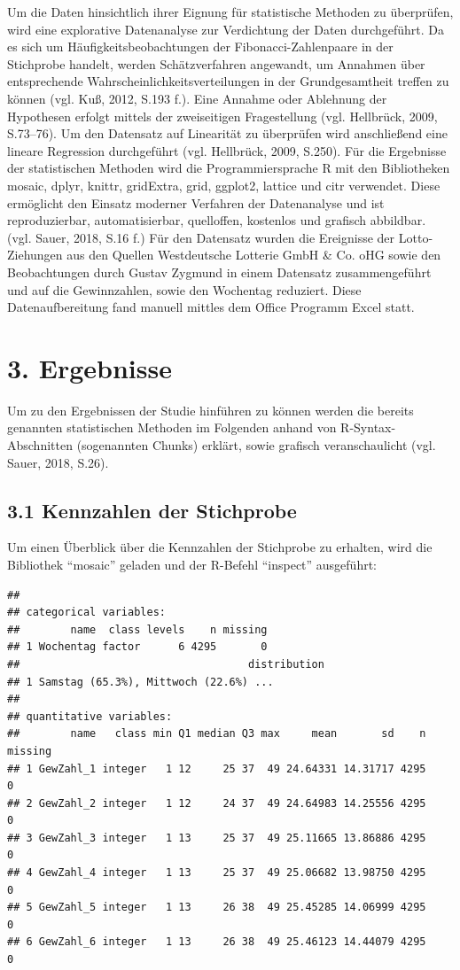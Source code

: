 \documentclass[ngerman,]{article}
\begin{document}
Um die Daten hinsichtlich ihrer Eignung für statistische Methoden zu
überprüfen, wird eine explorative Datenanalyse zur Verdichtung der Daten
durchgeführt. Da es sich um Häufigkeitsbeobachtungen der
Fibonacci-Zahlenpaare in der Stichprobe handelt, werden Schätzverfahren
angewandt, um Annahmen über entsprechende
Wahrscheinlichkeitsverteilungen in der Grundgesamtheit treffen zu können
(vgl. Kuß, 2012, S.193 f.). Eine Annahme oder Ablehnung der Hypothesen
erfolgt mittels der zweiseitigen Fragestellung (vgl. Hellbrück, 2009,
S.73--76). Um den Datensatz auf Linearität zu überprüfen wird
anschließend eine lineare Regression durchgeführt (vgl. Hellbrück, 2009,
S.250). Für die Ergebnisse der statistischen Methoden wird die
Programmiersprache R mit den Bibliotheken mosaic, dplyr, knittr,
gridExtra, grid, ggplot2, lattice und citr verwendet. Diese ermöglicht
den Einsatz moderner Verfahren der Datenanalyse und ist reproduzierbar,
automatisierbar, quelloffen, kostenlos und grafisch abbildbar. (vgl.
Sauer, 2018, S.16 f.) Für den Datensatz wurden die Ereignisse der
Lotto-Ziehungen aus den Quellen Westdeutsche Lotterie GmbH \& Co. oHG
sowie den Beobachtungen durch Gustav Zygmund in einem Datensatz
zusammengeführt und auf die Gewinnzahlen, sowie den Wochentag reduziert.
Diese Datenaufbereitung fand manuell mittles dem Office Programm Excel
statt.

\section{3. Ergebnisse}\label{ergebnisse}

Um zu den Ergebnissen der Studie hinführen zu können werden die bereits
genannten statistischen Methoden im Folgenden anhand von
R-Syntax-Abschnitten (sogenannten Chunks) erklärt, sowie grafisch
veranschaulicht (vgl. Sauer, 2018, S.26).

\subsection{3.1 Kennzahlen der
Stichprobe}\label{kennzahlen-der-stichprobe}

Um einen Überblick über die Kennzahlen der Stichprobe zu erhalten, wird
die Bibliothek ``mosaic'' geladen und der R-Befehl ``inspect''
ausgeführt:

\begin{verbatim}
## 
## categorical variables:  
##        name  class levels    n missing
## 1 Wochentag factor      6 4295       0
##                                    distribution
## 1 Samstag (65.3%), Mittwoch (22.6%) ...        
## 
## quantitative variables:  
##        name   class min Q1 median Q3 max     mean       sd    n missing
## 1 GewZahl_1 integer   1 12     25 37  49 24.64331 14.31717 4295       0
## 2 GewZahl_2 integer   1 12     24 37  49 24.64983 14.25556 4295       0
## 3 GewZahl_3 integer   1 13     25 37  49 25.11665 13.86886 4295       0
## 4 GewZahl_4 integer   1 13     25 37  49 25.06682 13.98750 4295       0
## 5 GewZahl_5 integer   1 13     26 38  49 25.45285 14.06999 4295       0
## 6 GewZahl_6 integer   1 13     26 38  49 25.46123 14.44079 4295       0
\end{verbatim}
\end{document}
